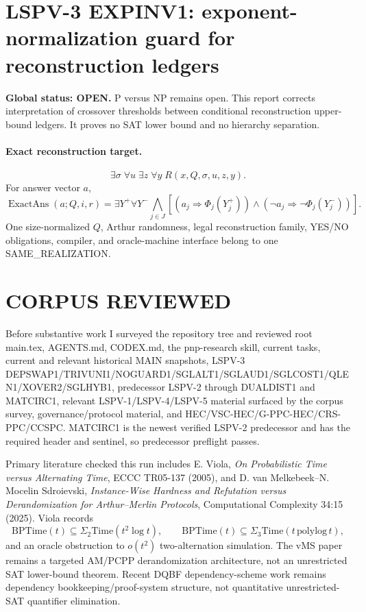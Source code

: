\documentclass[11pt]{article}
\begin{document}
\section*{LSPV-3 EXPINV1: exponent-normalization guard for reconstruction ledgers}
\textbf{Global status: OPEN.} P versus NP remains open. This report corrects interpretation of crossover thresholds between conditional reconstruction upper-bound ledgers. It proves no SAT lower bound and no hierarchy separation.

\paragraph{Exact reconstruction target.}
\[
\boxed{\exists\sigma\;\forall u\;\exists z\;\forall y\;R(x,Q,\sigma,u,z,y).}
\]
For answer vector \(a\),
\[
\operatorname{ExactAns}(a;Q,i,r)=\exists Y^+\forall Y^-\bigwedge_{j\in J}[(a_j\Rightarrow\Phi_j(Y_j^+))\wedge(\neg a_j\Rightarrow\neg\Phi_j(Y_j^-))].
\]
One size-normalized \(Q\), Arthur randomness, legal reconstruction family, YES/NO obligations, compiler, and oracle-machine interface belong to one SAME_REALIZATION.

\section*{CORPUS REVIEWED}
Before substantive work I surveyed the repository tree and reviewed root main.tex, AGENTS.md, CODEX.md, the pnp-research skill, current tasks, current and relevant historical MAIN snapshots, LSPV-3 DEPSWAP1/TRIVUNI1/NOGUARD1/SGLALT1/SGLAUD1/SGLCOST1/QLEN1/XOVER2/SGLHYB1, predecessor LSPV-2 through DUALDIST1 and MATCIRC1, relevant LSPV-1/LSPV-4/LSPV-5 material surfaced by the corpus survey, governance/protocol material, and HEC/VSC-HEC/G-PPC-HEC/CRS-PPC/CCSPC. MATCIRC1 is the newest verified LSPV-2 predecessor and has the required header and sentinel, so predecessor preflight passes.

Primary literature checked this run includes E. Viola, \emph{On Probabilistic Time versus Alternating Time}, ECCC TR05-137 (2005), and D. van Melkebeek--N. Mocelin Sdroievski, \emph{Instance-Wise Hardness and Refutation versus Derandomization for Arthur--Merlin Protocols}, Computational Complexity 34:15 (2025). Viola records
\[
\mathrm{BPTime}(t)\subseteq\Sigma_2\mathrm{Time}(t^2\log t),\qquad
\mathrm{BPTime}(t)\subseteq\Sigma_3\mathrm{Time}(t\,\mathrm{polylog}\,t),
\]
and an oracle obstruction to \(o(t^2)\) two-alternation simulation. The vMS paper remains a targeted AM/PCPP derandomization architecture, not an unrestricted SAT lower-bound theorem. Recent DQBF dependency-scheme work remains dependency bookkeeping/proof-system structure, not quantitative unrestricted-SAT quantifier elimination.
\end{document}
